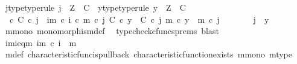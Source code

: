 \begin{isabellebody}
\ j{\isacharunderscore}{\kern0pt}type{\isacharbrackleft}{\kern0pt}type{\isacharunderscore}{\kern0pt}rule{\isacharbrackright}{\kern0pt}{\isacharcolon}{\kern0pt}\ {\isachardoublequoteopen}j\ {\isacharcolon}{\kern0pt}\ Z\ {\isasymrightarrow}\ C{\isachardoublequoteclose}\ \ y{\isacharunderscore}{\kern0pt}type{\isacharbrackleft}{\kern0pt}type{\isacharunderscore}{\kern0pt}rule{\isacharbrackright}{\kern0pt}{\isacharcolon}{\kern0pt}\ {\isachardoublequoteopen}y\ {\isacharcolon}{\kern0pt}\ Z\ {\isasymrightarrow}\ C{\isachardoublequoteclose}\isanewline
\ \ \ \ \isamarkupfalse%
\ {\isachardoublequoteopen}{\isasymt}\ {\isasymcirc}\isactrlsub c\ {\isasymbeta}\isactrlbsub C\isactrlesub \ {\isasymcirc}\isactrlsub c\ j\ {\isacharequal}{\kern0pt}\ {\isacharparenleft}{\kern0pt}{\isasymchi}im\ {\isasymcirc}\isactrlsub c\ i{\isacharparenright}{\kern0pt}\ {\isasymcirc}\isactrlsub c\ m\ {\isasymcirc}\isactrlsub c\ j{\isachardoublequoteclose}\ {\isachardoublequoteopen}{\isasymbeta}\isactrlbsub C\isactrlesub \ {\isasymcirc}\isactrlsub c\ y\ {\isacharequal}{\kern0pt}\ {\isasymbeta}\isactrlbsub C\isactrlesub \ {\isasymcirc}\isactrlsub c\ j{\isachardoublequoteclose}\ {\isachardoublequoteopen}m\ {\isasymcirc}\isactrlsub c\ y\ {\isacharequal}{\kern0pt}\ m\ {\isasymcirc}\isactrlsub c\ j{\isachardoublequoteclose}\isanewline
\ \ \ \ \isamarkupfalse%
\ \isamarkupfalse%
\ {\isachardoublequoteopen}j\ {\isacharequal}{\kern0pt}\ y{\isachardoublequoteclose}\isanewline
\ \ \ \ \ \ \isamarkupfalse%
\ m{\isacharunderscore}{\kern0pt}mono\ monomorphism{\isacharunderscore}{\kern0pt}def{}\ \isamarkupfalse%
\ {\isacharparenleft}{\kern0pt}typecheck{\isacharunderscore}{\kern0pt}cfuncs{\isacharunderscore}{\kern0pt}prems{\isacharcomma}{\kern0pt}\ blast{\isacharparenright}{\kern0pt}\isanewline
\ \ \isamarkupfalse%
\isanewline
\ \ \isamarkupfalse%
\ \isamarkupfalse%
\ {\isasymchi}im{\isacharunderscore}{\kern0pt}i{\isacharunderscore}{\kern0pt}eq{\isacharunderscore}{\kern0pt}{\isasymchi}m{\isacharcolon}{\kern0pt}\ {\isachardoublequoteopen}{\isasymchi}im\ {\isasymcirc}\isactrlsub c\ i\ {\isacharequal}{\kern0pt}\ {\isasymchi}m{\isachardoublequoteclose}\isanewline
\ \ \ \ \isamarkupfalse%
\ {\isasymchi}m{\isacharunderscore}{\kern0pt}def\ characteristic{\isacharunderscore}{\kern0pt}func{\isacharunderscore}{\kern0pt}is{\isacharunderscore}{\kern0pt}pullback\ characteristic{\isacharunderscore}{\kern0pt}function{\isacharunderscore}{\kern0pt}exists\ m{\isacharunderscore}{\kern0pt}mono\ m{\isacharunderscore}{\kern0pt}type\ \isamarkupfalse%

\end{isabellebody}
